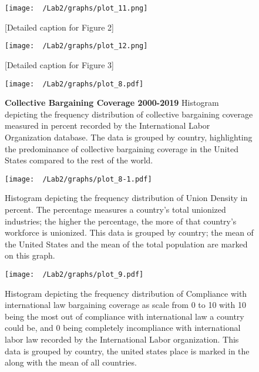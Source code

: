 \documentclass[11pt]{article}\usepackage[]{graphicx}\usepackage[]{xcolor}
\begin{document}
\begin{figure}[h]
\centering
\begin{minipage}{0.9\linewidth}
  \texttt{[image: ~/Lab2/graphs/plot\_11.png]}
  \caption{[Detailed caption for Figure 2]}
  \label{fig:1.2}
  \end{minipage}
\end{figure}

\begin{figure}[h]
\centering
\begin{minipage}{0.9\linewidth}
  \texttt{[image: ~/Lab2/graphs/plot\_12.png]}
  \caption{[Detailed caption for Figure 3]}
  \label{fig:1.3}
  \end{minipage}
\end{figure}

\begin{figure}[h]
\centering
\begin{minipage}{0.7\linewidth}
  \texttt{[image: ~/Lab2/graphs/plot\_8.pdf]}
  \caption[Collective Bargaining Coverage]{\textbf {Collective Bargaining Coverage 2000-2019} Histogram depicting the frequency distribution of collective bargaining coverage measured in percent recorded by the International Labor Organization database. The data is grouped by country, highlighting the predominance of collective bargaining coverage in the United States compared to the rest of the world.}
  \label{fig:2.1}
  \end{minipage}
\end{figure}

\begin{figure}[h]
\centering
  \begin{minipage}{0.7\linewidth}
  \texttt{[image: ~/Lab2/graphs/plot\_8-1.pdf]}
  \caption{Histogram depicting the frequency distribution of Union Density in percent. The percentage measures a country's total unionized industries; the higher the percentage, the more of that country's workforce is unionized. This data is grouped by country; the mean of the United States and the mean of the total population are marked on this graph.} 
  \label{fig:2.2}
  \end{minipage}
\end{figure}

\begin{figure}[h]
\centering
  \begin{minipage}{0.7\linewidth}
  \texttt{[image: ~/Lab2/graphs/plot\_9.pdf]}
  \caption{Histogram depicting the frequency distribution of Compliance with international law bargaining coverage as scale from 0 to 10 with 10 being the most out of compliance with international law a country could be, and 0 being completely incompliance with international labor law recorded by the International Labor organization. This data is grouped by country, the united states place is marked in the along with the mean of all countries.}
  \label{fig:2.3}
  \end{minipage}
\end{figure}
\end{document}
